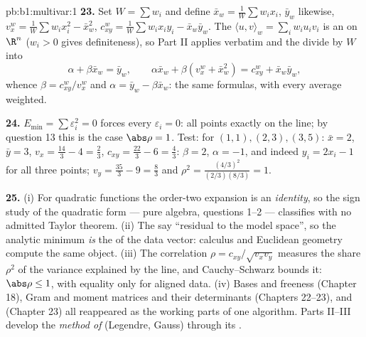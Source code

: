 \begin{solution}{pb:b1:multivar:1}
\textbf{23.} Set $W = \sum w_i$ and define $\bar x_w =
\frac1W\sum w_ix_i$, $\bar y_w$ likewise, $v_x^w = \frac1W\sum
w_ix_i^2 - \bar x_w^2$, $c^w_{xy} = \frac1W\sum w_ix_iy_i - \bar
x_w\bar y_w$. The  $\langle u, v\rangle_w = \sum_i w_iu_iv_i$
is an  on $\R^n$ ($w_i > 0$ gives definiteness), so
Part II applies verbatim and the  divide by $W$
into
\[
\alpha + \beta\bar x_w = \bar y_w,
\qquad
\alpha\bar x_w + \beta(v^w_x + \bar x_w^2) = c^w_{xy} + \bar
x_w\bar y_w ,
\]
whence $\beta = c^w_{xy}/v^w_x$ and $\alpha = \bar y_w -
\beta\bar x_w$: the same formulas, with every average weighted.

\textbf{24.} $E_{\min} = \sum\varepsilon_i^2 = 0$ forces every
$\varepsilon_i = 0$: all points exactly on the line; by question
13 this is the case $\abs\rho = 1$. Test: for $(1,1), (2,3),
(3,5)$: $\bar x = 2$, $\bar y = 3$, $v_x = \frac{14}3 - 4 =
\frac23$, $c_{xy} = \frac{22}3 - 6 = \frac43$: $\beta = 2$,
$\alpha = -1$, and indeed $y_i = 2x_i - 1$ for all three points;
$v_y = \frac{35}3 - 9 = \frac83$ and $\rho^2 =
\frac{(4/3)^2}{(2/3)(8/3)} = 1$.

\textbf{25.} (i) For quadratic functions the order-two expansion
is an \emph{identity}, so the sign study of the quadratic form
--- pure algebra, questions 1--2 --- classifies 
with no admitted Taylor theorem. (ii) The  say
``residual  to the model space'', so the analytic
minimum \emph{is} the  of the data vector:
calculus and Euclidean geometry compute the same object. (iii)
The correlation $\rho = c_{xy}/\sqrt{v_xv_y}$ measures the share
$\rho^2$ of the variance explained by the line, and
Cauchy--Schwarz bounds it: $\abs\rho \leq 1$, with equality only
for aligned data. (iv) Bases and freeness (Chapter 18), Gram
and moment matrices and their determinants (Chapters 22--23),
and  (Chapter 23) all reappeared as the
working parts of one algorithm. Parts II--III develop the
\emph{method of } (Legendre, Gauss) through its
\emph{}.
\end{solution}
